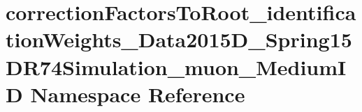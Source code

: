 \hypertarget{namespacecorrectionFactorsToRoot__identificationWeights__Data2015D__Spring15DR74Simulation__muon__MediumID}{
\section{correctionFactorsToRoot\_\-identificationWeights\_\-Data2015D\_\-Spring15DR74Simulation\_\-muon\_\-MediumID Namespace Reference}
\label{namespacecorrectionFactorsToRoot__identificationWeights__Data2015D__Spring15DR74Simulation__muon__MediumID}
}
